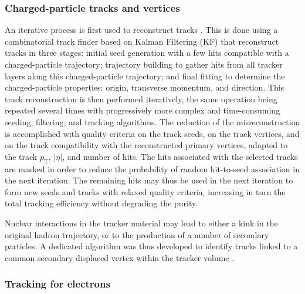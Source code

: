 \subsubsection{Charged-particle tracks and vertices}
An iterative process is first used to reconstruct tracks \cite{tracker}. This is done using a combinatorial track finder based on Kalman Filtering (KF) that reconstruct tracks in three stages:  initial seed generation with a few hits compatible with a charged-particle trajectory; trajectory building to gather hits from all tracker layers along this charged-particle trajectory; and final fitting to determine the charged-particle properties: origin, transverse momentum, and direction. This track reconstruction is then performed iteratively, the same operation being repeated several times with progressively more complex and time-consuming seeding, filtering, and tracking algorithms. The reduction of the misreconstruction is accomplished with quality criteria on the track seeds, on the track vertices, and on the track compatibility with the reconstructed primary vertices, adapted to the track $p_{\mathrm{T}}$, $|\eta|$, and number of hits. The hits associated with the selected tracks are masked in order to reduce the probability of random hit-to-seed association in the next iteration. The remaining hits may thus be used in the next iteration to form new seeds and tracks with relaxed quality criteria, increasing in turn the total tracking efficiency without degrading the purity.

Nuclear interactions in the tracker material may lead to either a kink in the original hadron trajectory, or to the production of a number of secondary particles. A dedicated algorithm was thus developed to identify tracks linked to a common secondary displaced vertex within the tracker volume \cite{CMS-PAS-TRK-10-003,Khachatryan2010}.

\subsubsection{Tracking for electrons}

